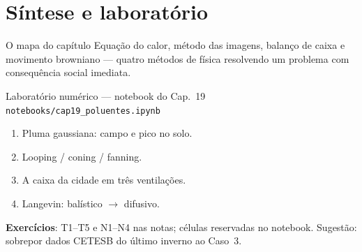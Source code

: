 \documentclass[aspectratio=169,11pt]{beamer}
\begin{document}
\section{Síntese e laboratório}

\begin{frame}{O mapa do capítulo}
  \vspace{0.6em}
  Equação do calor, método das imagens, balanço de caixa e movimento
  browniano — quatro métodos de física resolvendo um problema com
  consequência social imediata.
\end{frame}

\begin{frame}{Laboratório numérico --- notebook do Cap.~19}
  \texttt{notebooks/cap19\_poluentes.ipynb}
  \begin{enumerate}
    \item Pluma gaussiana: campo e pico no solo.
    \item Looping / coning / fanning.
    \item A caixa da cidade em três ventilações.
    \item Langevin: balístico $\to$ difusivo.
  \end{enumerate}
  \vspace{0.4em}
  \textbf{Exercícios}: T1--T5 e N1--N4 nas notas; células reservadas no
  notebook. Sugestão: sobrepor dados CETESB do último inverno ao
  Caso~3.
  \vfill
  \atribuicao
\end{frame}
\end{document}
